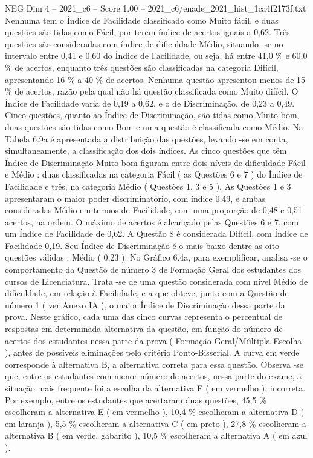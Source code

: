\begin{textsample}{NEG Dim 4 – 2021\_c6 – Score 1.00 – 2021\_c6/enade\_2021\_hist\_1ca4f2173f.txt}
Nenhuma tem o Índice de Facilidade classificado como Muito fácil, e duas questões são tidas como Fácil, por terem índice de acertos iguais a 0,62.
Três questões são consideradas com índice de dificuldade Médio, situando -se no intervalo entre 0,41 e 0,60 do Índice de Facilidade, ou seja, há entre 41,0 \% e 60,0 \% de acertos, enquanto três questões são classificadas na categoria Difícil, apresentando 16 \% a 40 \% de acertos.
Nenhuma questão apresentou menos de 15 \% de acertos, razão pela qual não há questão classificada como Muito difícil.
O Índice de Facilidade varia de 0,19 a 0,62, e o de Discriminação, de 0,23 a 0,49.
Cinco questões, quanto ao Índice de Discriminação, são tidas como Muito bom, duas questões são tidas como Bom e uma questão é classificada como Médio.
Na Tabela 6.9a é apresentada a distribuição das questões, levando -se em conta, simultaneamente, a classificação dos dois índices.
As cinco questões que têm Índice de Discriminação Muito bom figuram entre dois níveis de dificuldade Fácil e Médio : duas classificadas na categoria Fácil ( as Questões 6 e 7 ) do Índice de Facilidade e três, na categoria Médio ( Questões 1, 3 e 5 ).
As Questões 1 e 3 apresentaram o maior poder discriminatório, com índice 0,49, e ambas consideradas Médio em termos de Facilidade, com uma proporção de 0,48 e 0,51 acertos, na ordem.
O máximo de acertos é alcançado pelas Questões 6 e 7, com um Índice de Facilidade de 0,62.
A Questão 8 é considerada Difícil, com Índice de Facilidade 0,19.
Seu Índice de Discriminação é o mais baixo dentre as oito questões válidas : Médio ( 0,23 ).
No Gráfico 6.4a, para exemplificar, analisa -se o comportamento da Questão de número 3 de Formação Geral dos estudantes dos cursos de Licenciatura.
Trata -se de uma questão considerada com nível Médio de dificuldade, em relação à Facilidade, e a que obteve, junto com a Questão de número 1 ( ver Anexo IA ), o maior Índice de Discriminação dessa parte da prova.
Neste gráfico, cada uma das cinco curvas representa o percentual de respostas em determinada alternativa da questão, em função do número de acertos dos estudantes nessa parte da prova ( Formação Geral/Múltipla Escolha ), antes de possíveis eliminações pelo critério Ponto-Bisserial.
A curva em verde corresponde à alternativa B, a alternativa correta para essa questão.
Observa -se que, entre os estudantes com menor número de acertos, nessa parte do exame, a situação mais frequente foi a escolha da alternativa E ( em vermelho ), incorreta.
Por exemplo, entre os estudantes que acertaram duas questões, 45,5 \% escolheram a alternativa E ( em vermelho ), 10,4 \% escolheram a alternativa D ( em laranja ), 5,5 \% escolheram a alternativa C ( em preto ), 27,8 \% escolheram a alternativa B ( em verde, gabarito ), 10,5 \% escolheram a alternativa A ( em azul ).

\end{textsample}
